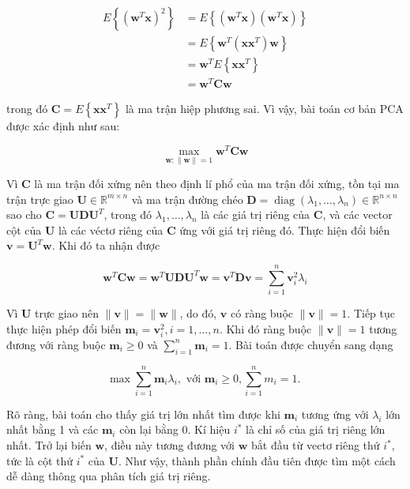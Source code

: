 \documentclass[12pt,a4paper,oneside]{report}
\numberwithin{equation}{section}
\begin{document}
$$
\begin{aligned}
	E\left\{\left(\mathbf{w}^{T} \mathbf{x}\right)^{2}\right\}&=E\left\{\left(\mathbf{w}^{T} \mathbf{x}\right)\left(\mathbf{w}^{T} \mathbf{x}\right)\right\}\\
	 &=E\left\{\mathbf{w}^{T}\left(\mathbf{x} \mathbf{x}^{T}\right) \mathbf{w}\right\}\\
	 & =\mathbf{w}^{T} E\left\{\mathbf{x} \mathbf{x}^{T}\right\} \\
	& =\mathbf{w}^{T} \mathbf{C} \mathbf{w}
\end{aligned}
$$

trong đó $\mathbf{C}=E\left\{\mathbf{x} \mathbf{x}^{T}\right\}$ là ma trận hiệp phương sai. Vì vậy, bài toán cơ bản $\mathrm{PCA}$ được xác định như sau:

$$
\max _{\mathbf{w}:\|\mathbf{w}\|=1} \mathbf{w}^{T}\mathbf{Cw}
$$

Vì $\mathbf{C}$ là ma trận đối xứng nên theo định lí phổ của ma trận đối xứng, tồn tại ma trận trực giao $\mathbf{U} \in \mathbb{R}^{m \times n}$ và ma trận đường chéo $\mathbf{D}=\operatorname{diag}\left(\lambda_{1}, \ldots, \lambda_{n}\right) \in \mathbb{R}^{n \times n}$ sao cho $\mathbf{C} = \mathbf{U} \mathbf{D} \mathbf{ U}^{T}$, trong đó $\lambda_{1}, \ldots, \lambda_{n}$ là các giá trị riêng của $\mathbf{C}$, và các vector cột của $\mathbf{U}$ là các véctơ riêng của $\mathbf{C}$ ứng với giá trị riêng đó. Thực hiện đổi biến $\mathbf{v}=\mathbf{U}^{T} \mathbf{w}$. Khi đó ta nhận được

$$
\mathbf{w}^{T} \mathbf{C} \mathbf{w}=\mathbf{w}^{T} \mathbf{U} \mathbf{D} \mathbf{U}^{T} \mathbf{w}=\mathbf{v}^{T} \mathbf{D} \mathbf{v}=\sum_{i=1}^{n} \mathbf{v}_{i}^{2} \lambda_{i}
$$

Vì $\mathbf{U}$ trực giao nên $\|\mathbf{v}\|=\|\mathbf{w}\|$, do đó, $\mathbf{v}$ có ràng buộc $\|\mathbf{v}\|=1$. Tiếp tục thực hiện phép đổi biến $\mathbf{m}_{i}=\mathbf{v}_{i}^{2}, i=1, \ldots, n$. Khi đó ràng buộc $\|\mathbf{v}\|=1$ tương đương với ràng buộc $\mathbf{m}_{i} \geq 0$ và $\sum_{i=1}^{n} \mathbf{m}_{i}=1$. Bài toán được chuyển sang dạng

$$
\max \sum_{i=1}^{n} \mathbf{m}_{i} \lambda_{i}, \text { với } \mathbf{m}_{i} \geq 0, \sum_{i=1}^{n} m_{i}=1 \text {. }
$$

Rõ ràng, bài toán cho thấy giá trị lớn nhất tìm được khi $\mathbf{m}_{i}$ tương ứng với $\lambda_{i}$ lớn nhất bằng 1 và các $\mathbf{m}_{i}$ còn lại bằng 0. Kí hiệu $i^{*}$ là chỉ số của giá trị riêng lớn nhất. Trở lại biến $\mathbf{w}$, điều này tương đương với $\mathbf{w}$ bắt đầu từ vectơ riêng thứ $i^{*}$, tức là cột thứ $i^{*}$ của $\mathbf{U}$. Như vậy, thành phần chính đầu tiên được tìm một cách dễ dàng thông qua phân tích giá trị riêng.
\end{document}
